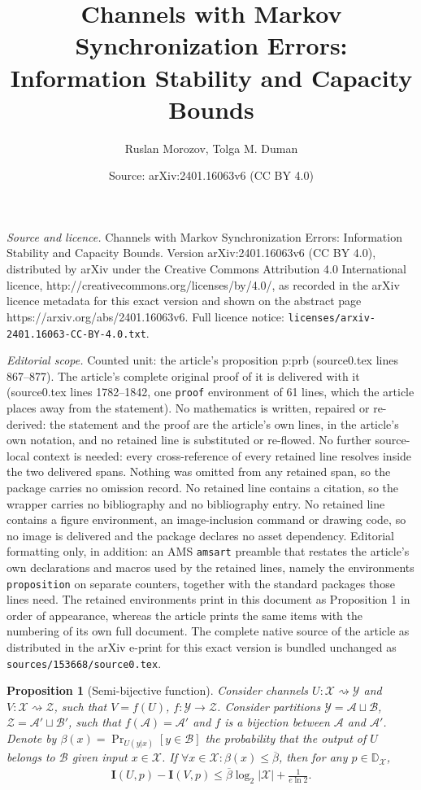 \documentclass[10pt,a4paper]{amsart}
\title{Channels with Markov Synchronization Errors: Information Stability and Capacity Bounds}
\author{Ruslan Morozov, Tolga M. Duman}
\date{Source: arXiv:2401.16063v6 (CC BY 4.0)}
\newtheorem{proposition}{Proposition}
\newcommand{\bD}{{\mathbb{D}}}
\newcommand{\bfI}{{\mathbf{I}}}
\newcommand{\brsq}[1]{{\left[{#1}\right]}}
\newcommand{\mA}{{\mathcal{A}}}
\newcommand{\mB}{{\mathcal{B}}}
\newcommand{\mX}{{\mathcal{X}}}
\newcommand{\mY}{{\mathcal{Y}}}
\newcommand{\mZ}{{\mathcal{Z}}}
\newcommand{\obeta}{\overline{\beta}}
\newcommand{\tosq}{\rightsquigarrow}
\begin{document}
\maketitle

\noindent\emph{Source and licence.} Channels with Markov Synchronization Errors: Information Stability and Capacity Bounds. Version arXiv:2401.16063v6 (CC BY 4.0), distributed by arXiv under the Creative Commons Attribution 4.0 International licence, http://creativecommons.org/licenses/by/4.0/, as recorded in the arXiv licence metadata for this exact version and shown on the abstract page https://arxiv.org/abs/2401.16063v6. Full licence notice: \texttt{licenses/arxiv-2401.16063-CC-BY-4.0.txt}.\par\smallskip

\noindent\textit{Editorial scope.} Counted unit: the article's proposition p:prb (source0.tex lines 867--877). The article's complete original proof of it is delivered with it (source0.tex lines 1782--1842, one \texttt{proof} environment of 61 lines, which the article places away from the statement). No mathematics is written, repaired or re-derived: the statement and the proof are the article's own lines, in the article's own notation, and no retained line is substituted or re-flowed.  No further source-local context is needed: every cross-reference of every retained line resolves inside the two delivered spans.  Nothing was omitted from any retained span, so the package carries no omission record.  No retained line contains a citation, so the wrapper carries no bibliography and no bibliography entry.  No retained line contains a figure environment, an image-inclusion command or drawing code, so no image is delivered and the package declares no asset dependency.  Editorial formatting only, in addition: an AMS \texttt{amsart} preamble that restates the article's own declarations and macros used by the retained lines, namely the environments \texttt{proposition} on separate counters, together with the standard packages those lines need.  The retained environments print in this document as Proposition 1 in order of appearance, whereas the article prints the same items with the numbering of its own full document.  The complete native source of the article as distributed in the arXiv e-print for this exact version is bundled unchanged as \texttt{sources/153668/source0.tex}.
\begin{proposition}[Semi-bijective function]
\label{p:prb}
Consider channels $U:\mX\tosq\mY$ and $V:\mX\tosq\mZ$, such that $V=f(U)$, $f:\mY\to\mZ$.
Consider partitions $\mY=\mA \sqcup \mB$, $\mZ=\mA' \sqcup \mB'$, such that $f(\mA)=\mA'$ and $f$ is a bijection between $\mA$ and $\mA'$.
Denote by $\beta(x)=\Pr_{U(y|x)}\brsq{y\in\mB}$ the probability that the output of $U$ belongs to $\mB$ given input $x\in\mX$.
If $\forall x\in\mX: \beta(x)\leq\obeta$, then for any $p\in\bD_\mX$,
\begin{align}
\bfI(U,p)-\bfI(V,p)\leq \obeta \log_2|\mX|+\frac{1}{e\ln 2}.
\label{eq:uvbeta}
\end{align}
\end{proposition}
\end{document}

